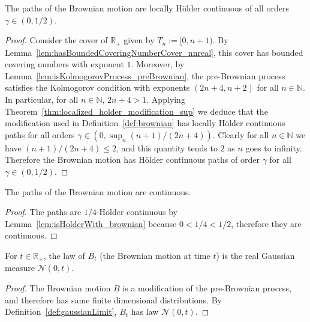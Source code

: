 \begin{lemma}\label{lem:isHolderWith_brownian}
  \leanok
The paths of the Brownian motion are locally Hölder continuous of all orders $\gamma \in (0, 1/2)$.
\end{lemma}

\begin{proof}\leanok
Consider the cover of $\mathbb{R}_+$ given by $T_n := [0, n + 1)$. By Lemma~\ref{lem:hasBoundedCoveringNumberCover_nnreal}, this cover has bounded covering numbers with exponent $1$. Moreover, by Lemma~\ref{lem:isKolmogorovProcess_preBrownian}, the pre-Brownian process satisfies the Kolmogorov condition with exponents $(2n + 4, n + 2)$ for all $n \in \mathbb{N}$.
In particular, for all $n \in \mathbb{N}$, $2n + 4 > 1$. Applying Theorem~\ref{thm:localized_holder_modification_sup} we deduce that the modification used in Definition~\ref{def:brownian} has locally Hölder continuous paths for all orders $\gamma \in (0, \sup_n (n + 1) / (2n + 4))$.
Clearly for all $n \in \mathbb{N}$ we have $(n + 1) / (2n + 4) \leqslant 2$, and this quantity tends to $2$ as $n$ goes to infinity. Therefore the Brownian motion has Hölder continuous paths of order $\gamma$ for all $\gamma \in (0, 1 / 2)$.
\end{proof}


\begin{lemma}\label{lem:continuous_brownian}
  \leanok
The paths of the Brownian motion are continuous.
\end{lemma}

\begin{proof}\leanok
The paths are $1/4$-Hölder continuous by Lemma~\ref{lem:isHolderWith_brownian} because $0 < 1/4 < 1/2$, therefore they are continuous.
\end{proof}


\begin{lemma}\label{lem:measurePreserving_brownian_apply}
  \leanok
For $t \in \mathbb{R}_+$, the law of $B_t$ (the Brownian motion at time $t$) is the real Gaussian measure $\mathcal{N}(0,t)$.
\end{lemma}

\begin{proof}\leanok
The Brownian motion $B$ is a modification of the pre-Brownian process, and therefore has same finite dimensional distributions. By Definition~\ref{def:gaussianLimit}, $B_t$ has law $\mathcal{N}(0,t)$.
\end{proof}


